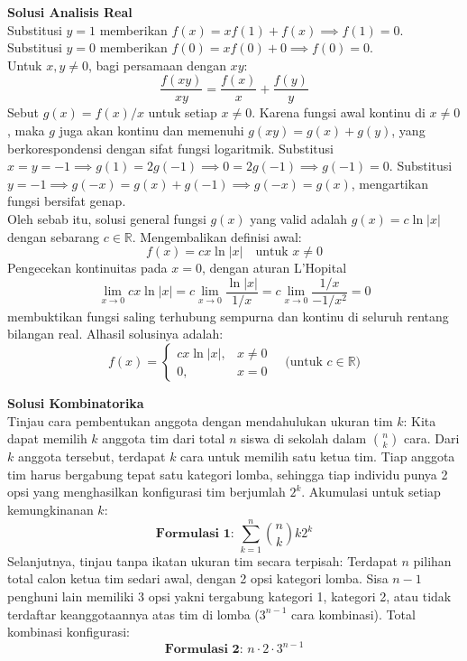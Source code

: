 \documentclass{article}
\begin{document}
\textbf{Solusi Analisis Real} \\
Substitusi $y = 1$ memberikan $f(x) = xf(1) + f(x) \implies f(1)=0$. \\
Substitusi $y = 0$ memberikan $f(0) = xf(0) + 0 \implies f(0)=0$. \\
Untuk $x,y \neq 0$, bagi persamaan dengan $xy$:
\[ \frac{f(xy)}{xy} = \frac{f(x)}{x} + \frac{f(y)}{y} \]
Sebut $g(x) = f(x)/x$ untuk setiap $x \neq 0$. Karena fungsi awal kontinu di $x \neq 0$, maka $g$ juga akan kontinu dan memenuhi $g(xy) = g(x) + g(y)$, yang berkorespondensi dengan sifat fungsi logaritmik.
Substitusi $x = y = -1 \implies g(1) = 2g(-1) \implies 0=2g(-1) \implies g(-1)=0$.
Substitusi $y = -1 \implies g(-x) = g(x) + g(-1) \implies g(-x) = g(x)$, mengartikan fungsi bersifat genap. \\
Oleh sebab itu, solusi general fungsi $g(x)$ yang valid adalah $g(x) = c\ln|x|$ dengan sebarang $c \in \mathbb{R}$.
Mengembalikan definisi awal:
\[ f(x) = cx\ln|x| \quad \text{untuk } x \neq 0 \]
Pengecekan kontinuitas pada $x=0$, dengan aturan L'Hopital $$\lim_{x \to 0} cx\ln|x| = c \lim_{x \to 0} \frac{\ln|x|}{1/x} = c \lim_{x \to 0} \frac{1/x}{-1/x^2} = 0$$ membuktikan fungsi saling terhubung sempurna dan kontinu di seluruh rentang bilangan real. Alhasil solusinya adalah:
\[ f(x)=\begin{cases} c x \ln|x|, & x \neq 0 \\ 0, & x = 0 \end{cases} \quad \text{(untuk } c \in \mathbb{R} \text{)} \]

\vspace{0.5cm}

\textbf{Solusi Kombinatorika} \\
Tinjau cara pembentukan anggota dengan mendahulukan ukuran tim $k$:
Kita dapat memilih $k$ anggota tim dari total $n$ siswa di sekolah dalam $\binom{n}{k}$ cara. Dari $k$ anggota tersebut, terdapat $k$ cara untuk memilih satu ketua tim. Tiap anggota tim harus bergabung tepat satu kategori lomba, sehingga tiap individu punya 2 opsi yang menghasilkan konfigurasi tim berjumlah $2^k$. Akumulasi untuk setiap kemungkinanan $k$:
\[ \textbf{Formulasi 1: } \sum_{k=1}^n \binom{n}{k} k 2^k \]
Selanjutnya, tinjau tanpa ikatan ukuran tim secara terpisah:
Terdapat $n$ pilihan total calon ketua tim sedari awal, dengan 2 opsi kategori lomba. Sisa $n-1$ penghuni lain memiliki 3 opsi yakni tergabung kategori 1, kategori 2, atau tidak terdaftar keanggotaannya atas tim di lomba ($3^{n-1}$ cara kombinasi). Total kombinasi konfigurasi:
\[ \textbf{Formulasi 2: } n \cdot 2 \cdot 3^{n-1} \]
\end{document}
